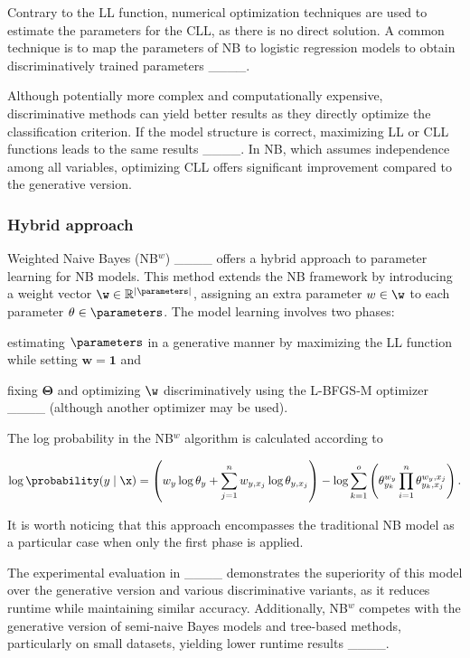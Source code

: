 Contrary to the LL function, numerical optimization techniques are used to estimate the parameters for the CLL, as there is no direct solution. A common technique is to map the parameters of NB to logistic regression models to obtain discriminatively trained parameters ____.

Although potentially more complex and computationally expensive, discriminative methods can yield better results as they directly optimize the classification criterion. If the model structure is correct, maximizing LL or CLL functions leads to the same results ____. In NB, which assumes independence among all variables, optimizing CLL offers significant improvement compared to the generative version.

\subsubsection{Hybrid approach} Weighted Naive Bayes (NB$^w$) ____ offers a hybrid approach to parameter learning for NB models. This method extends the NB framework by introducing a weight vector $\w \in \mathbb{R}^{|\parameters|}$, assigning an extra parameter \(w \in \w\) to each parameter \(\theta \in \parameters\). The model learning involves two phases:
%
\begin{enumerate*}[label=(\alph*)]
    \item estimating $\parameters$ in a generative manner by maximizing the LL function while setting $\mathbf{w} = \mathbf{1}$ and
    \item fixing $\mathbf{\Theta}$ and optimizing $\w$ discriminatively using the L-BFGS-M optimizer ____ (although another optimizer may be used).
\end{enumerate*}

The log probability in the NB$^w$ algorithm is calculated according to

\begin{equation*}
    \log \probability(y \mid \x) =  \left(w_y \log\theta_y + \sum_{j = 1}^{n} w_{y, x_j} \log \theta_{y, x_j}\right) - \log \sum_{k = 1}^{o} \left(\theta_{y_k}^{w_y} \prod_{i = 1}^n \theta_{y_k, x_j}^{w_y, x_j}\right).
\end{equation*}

It is worth noticing that this approach encompasses the traditional NB model as a particular case when only the first phase is applied.

The experimental evaluation in ____ demonstrates the superiority of this model over the generative version and various discriminative variants, as it reduces runtime while maintaining similar accuracy. Additionally, NB$^w$ competes with the generative version of semi-naive Bayes models and tree-based methods, particularly on small datasets, yielding lower runtime results ____.


